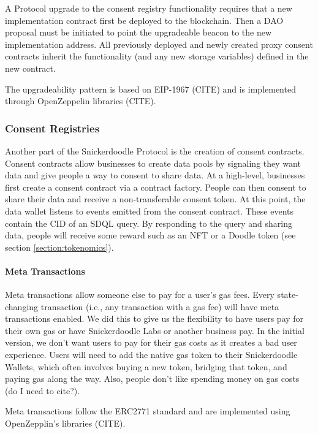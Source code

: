 A Protocol upgrade to the consent registry functionality requires that a new implementation contract first be deployed to the blockchain. Then a 
DAO proposal must be initiated to point the upgradeable beacon to the new implementation address. All previously deployed and newly created proxy 
consent contracts inherit the functionality (and any new storage variables) defined in the new contract.

The upgradeability pattern is based on EIP-1967 (CITE) and is implemented through OpenZeppelin libraries (CITE).

\subsubsection{Consent Registries}
\label{section:ConsentContract}



Another part of the Snickerdoodle Protocol is the creation of consent contracts. Consent contracts allow businesses to create data pools by 
signaling they want data and give people a way to consent to share data. At a high-level, businesses first create a consent contract via a 
contract factory. People can then consent to share their data and receive a non-transferable consent token. At this point, the data wallet 
listens to events emitted from the consent contract. These events contain the CID of an SDQL query. By responding to the query and sharing 
data, people will receive some reward such as an NFT or a Doodle token (see section \ref{section:tokenomics}).

\paragraph{Meta Transactions}

Meta transactions allow someone else to pay for a user's gas fees. Every state-changing transaction (i.e., any transaction with a gas fee) will 
have meta transactions enabled. We did this to give us the flexibility to have users pay for their own gas or have Snickerdoodle Labs or another 
business pay. In the initial version, we don't want users to pay for their gas costs as it creates a bad user experience. Users will need to add 
the native gas token to their Snickerdoodle Wallets, which often involves buying a new token, bridging that token, and paying gas along the way. 
Also, people don't like spending money on gas costs (do I need to cite?). 

Meta transactions follow the ERC2771 standard and are implemented using OpenZepplin's libraries (CITE).

